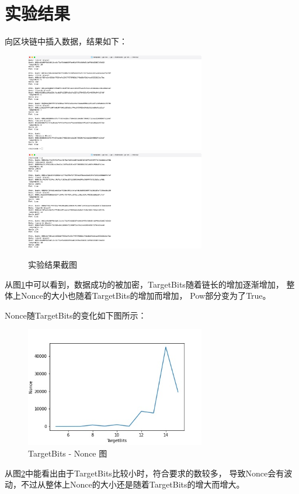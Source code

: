 \documentclass{article}
\begin{document}
    \section{实验结果}
    向区块链中插入数据，结果如下：
    \begin{figure}
        \centering
        \includegraphics*[width=0.7\textwidth]{./figs/pow_result1.jpg}
        \includegraphics*[width=0.7\textwidth]{./figs/pow_result2.jpg}
        \caption{实验结果截图}
        \label{result screenshot}
    \end{figure}

    从图\ref{result screenshot}中可以看到，数据成功的被加密，{\jetbrains TargetBits}随着链长的增加逐渐增加，
    整体上{\jetbrains Nonce}的大小也随着{\jetbrains TargetBits}的增加而增加，
    {\jetbrains Pow}部分变为了{\jetbrains True}。

    {\jetbrains Nonce}随{\jetbrains TargetBits}的变化如下图所示：
    \begin{figure}
        \centering
        \includegraphics*[width=0.7\textwidth]{./figs/targetbits-nonce.jpg}
        \caption{TargetBits - Nonce 图}
        \label{targetbits-nonce}
    \end{figure}
    从图\ref{targetbits-nonce}中能看出由于{\jetbrains TargetBits}比较小时，符合要求的数较多，
    导致{\jetbrains Nonce}会有波动，不过从整体上{\jetbrains Nonce}的大小还是随着{\jetbrains TargetBits}的增大而增大。
\end{document}

